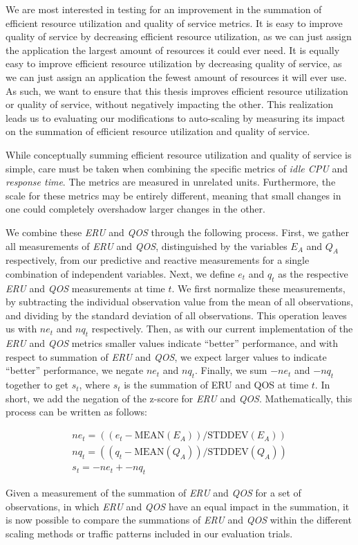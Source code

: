 We are most interested in testing for an improvement in the summation of
efficient resource utilization and quality of service metrics. It is
easy to improve quality of service by decreasing efficient resource
utilization, as we can just assign the application the largest amount of
resources it could ever need. It is equally easy to improve efficient resource
utilization by decreasing quality of service, as we can just assign an
application the fewest amount of resources it will ever use. As such, we want to
ensure that this thesis improves efficient resource utilization or quality of
service, without negatively impacting the other. This realization leads us to
evaluating our modifications to auto-scaling by measuring its impact on the
summation of efficient resource utilization and quality of service.

While conceptually summing efficient resource utilization and quality of service
is simple, care must be taken when combining the specific metrics of
\textit{idle CPU} and \textit{response time}. The metrics are measured in unrelated
units. Furthermore, the scale for these metrics may be entirely different,
meaning that small changes in one could completely overshadow larger changes in
the other.

We combine these \textit{ERU} and \textit{QOS} through the following process.
First, we gather all measurements of \textit{ERU} and \textit{QOS},
distinguished by the variables $E_{A}$ and $Q_{A}$ respectively, from our
predictive and reactive measurements for a single combination of independent
variables. Next, we define $e_{t}$ and $q_{t}$ as the
respective \textit{ERU} and \textit{QOS} measurements at time $t$. We first
normalize these measurements, by subtracting the individual observation value
from the mean of all observations, and dividing by the standard deviation of all
observations. This operation leaves us with $ne_{t}$ and $nq_{t}$ respectively.
Then, as with our current implementation of the \textit{ERU} and \textit{QOS}
metrics smaller values indicate ``better'' performance, and with respect to
summation of \textit{ERU} and \textit{QOS}, we expect larger values to indicate
``better'' performance, we negate $ne_{t}$ and $nq_{t}$. Finally, we sum
$-ne_{t}$ and $-nq_{t}$ together to get $s_{t}$, where $s_{t}$ is the summation
of ERU and QOS at time $t$. In short, we add the negation of the z-score for
\textit{ERU} and \textit{QOS}. Mathematically, this process can be written as
follows:

\begin{align*}
  ne_{t} = ((e_{t} - \mbox{MEAN}(E_{A})) / \mbox{STDDEV}(E_{A})) \\
  nq_{t} = ((q_{t} - \mbox{MEAN}(Q_{A})) / \mbox{STDDEV}(Q_{A})) \\
  s_{t} = -ne_{t} + -nq_{t}
\end{align*}

Given a measurement of the summation of \textit{ERU} and \textit{QOS} for a set
of observations, in which \textit{ERU} and \textit{QOS} have an equal impact in
the summation, it is now possible to compare the summations of \textit{ERU} and
\textit{QOS} within the different scaling methods or traffic patterns included
in our evaluation trials.
